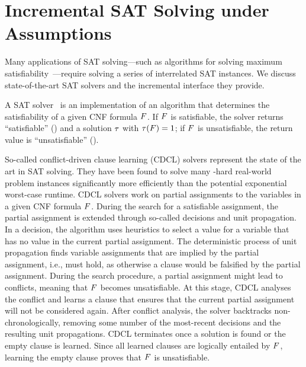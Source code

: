 \section{Incremental SAT Solving under Assumptions\label{sec:inc-sat}}

Many applications of SAT solving---such as algorithms for solving maximum satisfiability~\autocite{handbook2-maxsat}---require solving a series of interrelated SAT instances.
We discuss state-of-the-art SAT solvers and the incremental interface they provide.

A SAT solver~\autocite{handbook2-cdcl} is an implementation of an algorithm that determines the satisfiability of a given CNF formula $F$.
If $F$ is satisfiable, the solver returns ``satisfiable'' (\sat{}) and a solution $\tau$ with $\tau(F)=1$;
if $F$ is unsatisfiable, the return value is ``unsatisfiable'' (\unsat{}).

So-called conflict-driven clause learning (CDCL) solvers represent the state of the art in SAT solving.
They have been found to solve many \NP-hard real-world problem instances significantly more efficiently than the potential exponential worst-case runtime.
CDCL solvers work on partial assignments to the variables in a given CNF formula $F$.
During the search for a satisfiable assignment, the partial assignment is extended through so-called decisions and unit propagation.
In a decision, the algorithm uses heuristics to select a value for a variable that has no value in the current partial assignment.
The deterministic process of unit propagation finds variable assignments that are implied by the partial assignment, i.e., must hold, as otherwise a clause would be falsified by the partial assignment.
During the search procedure, a partial assignment might lead to conflicts, meaning that $F$ becomes unsatisfiable.
At this stage, CDCL analyses the conflict and learns a clause that ensures that the current partial assignment will not be considered again.
After conflict analysis, the solver backtracks non-chronologically, removing some number of the most-recent decisions and the resulting unit propagations.
CDCL terminates once a solution is found or the empty clause is learned.
Since all learned clauses are logically entailed by $F$, learning the empty clause proves that $F$ is unsatisfiable.

